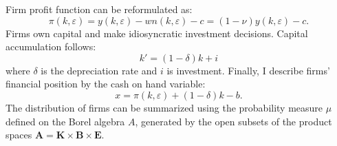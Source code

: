 \documentclass[12pt]{article}
\begin{document}
Firm profit function can be reformulated as: 
\begin{equation} \label{eq:profit}
\pi(k,\varepsilon) = y(k,\varepsilon) - wn(k,\varepsilon) - c = (1-\nu) y(k,\varepsilon) - c.
\end{equation} 
Firms own capital and make idiosyncratic investment decisions. Capital accumulation follows: 
\begin{equation} \label{eq:capital}
k' = (1-\delta)k + i
\end{equation} 
where $\delta$ is the depreciation rate and $i$ is investment. Finally, I describe firms' financial position by the cash on hand variable:
\begin{equation} \label{eq:cash on hand}
    x = \pi(k,\varepsilon) + (1-\delta)k - b.
\end{equation}
The distribution of firms can be summarized using the probability measure $\mu$ defined on the Borel algebra $A$, generated by the open subsets of the product spaces $ \mathbf{A} = \mathbf{K} \times \mathbf{B} \times \mathbf{E} $.
\end{document}
